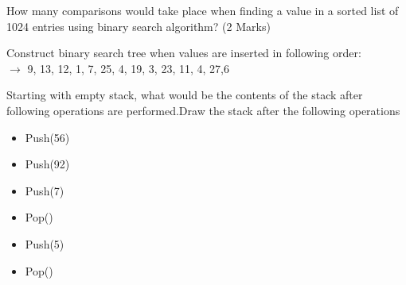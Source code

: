 \documentclass[11pt]{exam}
\begin{document}
\begin{questions}
\addpoints
\question[1] How many comparisons would take place when finding a value in a sorted list of 1024 entries using binary search algorithm? (2 Marks)
\vspace{2in}

\addpoints
\question[4] Construct binary search tree when values are inserted in following order:\\
 $\longrightarrow$ 9, 13, 12, 1, 7, 25, 4, 19, 3, 23, 11, 4, 27,6
\newpage

\addpoints
\question[2] Starting with empty stack, what would be the contents of the stack after following operations are performed.Draw the stack after the following operations
\begin{itemize}
\item Push(56)
\item Push(92)
\item Push(7)
\item Pop()
\item Push(5)
\item Pop()
\end{itemize}

\vspace{4in}

\end{questions}
\end{document}
